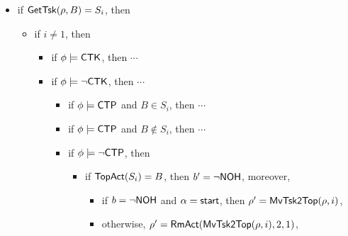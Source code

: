 \begin{itemize}
    \item if $\mathsf{GetTsk}(\rho,B) = S_i$, then
    \begin{itemize}
    \item if $i \neq 1$, then 
        \begin{itemize}
            \item if $\phi \models {\sf CTK}$, then $\cdots$ 
            \item if $\phi \models \neg {\sf CTK}$, then $\cdots$
                \begin{itemize}
                    \item if $\phi \models{\sf CTP}$ and $B \in S_i$, then $\cdots$
                    \item if $\phi \models{\sf CTP}$ and $B \notin S_i$, then $\cdots$
                    \item if $\phi \models\neg{\sf CTP}$, then
                            \begin{itemize}
                                \item if $\mathsf{TopAct}(S_i) = B$, then $b' = \neg {\sf NOH}$, moreover,
                                \begin{itemize}
                                    \item if $b = \neg {\sf NOH}$ and $\alpha = {\mathsf{start} }$, then $\rho'=\mathsf{MvTsk2Top}(\rho, i)$,
                                    \item otherwise, $\rho' = \mathsf{RmAct}(\mathsf{MvTsk2Top}(\rho, i), 2, 1)$, 

\end{itemize}
\end{itemize}
\end{itemize}
\end{itemize}
\end{itemize}
\end{itemize}
